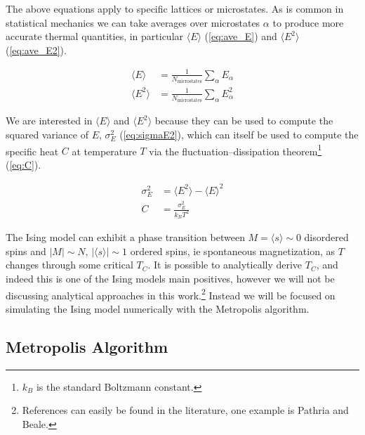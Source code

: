 \documentclass[notitlepage,aps,prd,nofootinbib]{revtex4-1}
\begin{document}
The above equations apply to specific lattices or microstates. As is common in statistical mechanics we can take averages over microstates $\alpha$ to produce more accurate thermal quantities, in particular $\langle E \rangle$ (\ref{eq:ave_E}) and $\langle E^{2} \rangle$ (\ref{eq:ave_E2}).

\begin{align}
\langle E \rangle &= \frac{1}{N_{\mathrm{microstates}}} \sum_{\alpha} E_{\alpha} \label{eq:ave_E} \\
\langle E^{2} \rangle &= \frac{1}{N_{\mathrm{microstates}}} \sum_{\alpha} E_{\alpha}^{2} \label{eq:ave_E2}
\end{align}

We are interested in $\langle E \rangle$ and $\langle E^{2} \rangle$ because they can be used to compute the squared variance of $E$, $\sigma_{E}^{2}$ (\ref{eq:sigmaE2}), which can itself be used to compute the specific heat $C$ at temperature $T$ via the fluctuation--dissipation theorem\footnote{$k_{B}$ is the standard Boltzmann constant.} (\ref{eq:C}).

\begin{align}
\sigma_{E}^{2} &=  \langle E^{2} \rangle - \langle E \rangle^{2} \label{eq:sigmaE2} \\
C &= \frac{\sigma_{E}^{2}}{k_{B} T^{2}} \label{eq:C}
\end{align}

The Ising model can exhibit a phase transition between $M=\langle s \rangle \sim 0$ disordered spins and $\left|M\right|\sim N,\,\left|\langle s \rangle\right| \sim 1$ ordered spins, ie spontaneous magnetization, as $T$ changes through some critical $T_{C}$. It is possible to analytically derive $T_{C}$, and indeed this is one of the Ising models main positives, however we will not be discussing analytical approaches in this work.\footnote{References can easily be found in the literature, one example is Pathria and Beale.} Instead we will be focused on simulating the Ising model numerically with the Metropolis algorithm.

\subsection{Metropolis Algorithm}
\label{subsec:met_alg}
\end{document}
